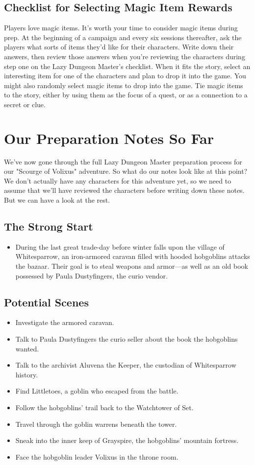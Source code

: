 \documentclass[10pt,a4paper,twoside,bg=print,twocolumn,openany,nodeprecatedcode]{dndbook}
\begin{document}
\subsection{Checklist for Selecting Magic Item Rewards}
Players love magic items. It's worth your time to consider magic items during prep.
At the beginning of a campaign and every six sessions thereafter, ask the players what sorts of items they'd like for their characters.
Write down their answers, then review those answers when you're reviewing the characters during step one on the Lazy Dungeon Master's checklist.
When it fits the story, select an interesting item for one of the characters and plan to drop it into the game.
You might also randomly select magic items to drop into the game.
Tie magic items to the story, either by using them as the focus of a quest, or as a connection to a secret or clue.
\section{Our Preparation Notes So Far}
We've now gone through the full Lazy Dungeon Master preparation process for our "Scourge of Volixus" adventure. So what do our notes look like at this point? We don't actually have any characters for this adventure yet, so we need to assume that we'll have reviewed the characters before writing down these notes. But we can have a look at the rest.
\subsection{The Strong Start}

\begin{itemize}
\item During the last great trade-day before winter falls upon the village of Whitesparrow, an iron-armored caravan filled with hooded hobgoblins attacks the bazaar. Their goal is to steal weapons and armor—as well as an old book possessed by Paula Dustyfingers, the curio vendor.
\end{itemize}

\subsection{Potential Scenes}

\begin{itemize}
\item Investigate the armored caravan.
\item Talk to Paula Dustyfingers the curio seller about the book the hobgoblins wanted.
\item Talk to the archivist Aluvena the Keeper, the custodian of Whitesparrow history.
\item Find Littletoes, a goblin who escaped from the battle.
\item Follow the hobgoblins' trail back to the Watchtower of Set.
\item Travel through the goblin warrens beneath the tower.
\item Sneak into the inner keep of Grayspire, the hobgoblins' mountain fortress.
\item Face the hobgoblin leader Volixus in the throne room.
\end{itemize}
\end{document}
